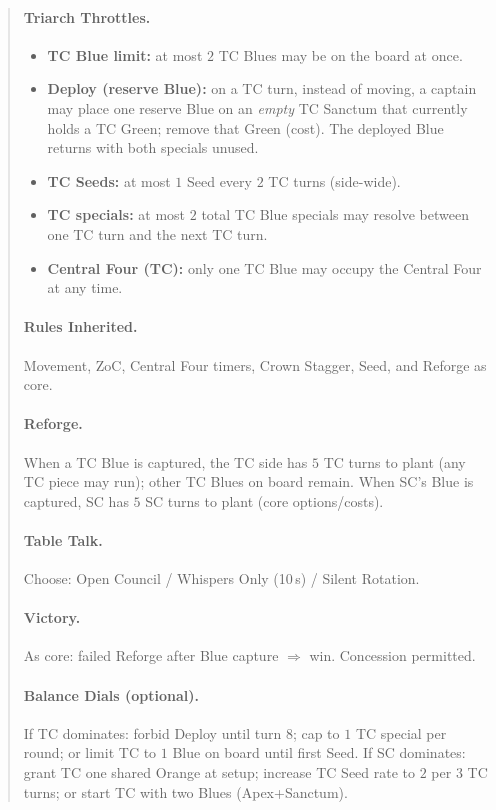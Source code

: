 \documentclass[11pt]{article}
\begin{document}
\begin{quote}
\paragraph{Triarch Throttles.}
\begin{itemize}
  \item \textbf{TC Blue limit:} at most $2$ TC Blues may be on the board at once.
  \item \textbf{Deploy (reserve Blue):} on a TC turn, instead of moving, a captain may place one reserve Blue on an \emph{empty} TC Sanctum that currently holds a TC Green; remove that Green (cost). The deployed Blue returns with both specials unused.
  \item \textbf{TC Seeds:} at most $1$ Seed every $2$ TC turns (side-wide).
  \item \textbf{TC specials:} at most $2$ total TC Blue specials may resolve between one TC turn and the next TC turn.
  \item \textbf{Central Four (TC):} only one TC Blue may occupy the Central Four at any time.
\end{itemize}

\paragraph{Rules Inherited.} Movement, ZoC, Central Four timers, Crown Stagger, Seed, and Reforge as core.

\paragraph{Reforge.} When a TC Blue is captured, the TC side has $5$ TC turns to plant (any TC piece may run); other TC Blues on board remain. When SC's Blue is captured, SC has $5$ SC turns to plant (core options/costs).

\paragraph{Table Talk.} Choose: Open Council / Whispers Only (10\,s) / Silent Rotation.

\paragraph{Victory.} As core: failed Reforge after Blue capture $\Rightarrow$ win. Concession permitted.

\paragraph{Balance Dials (optional).} If TC dominates: forbid Deploy until turn 8; cap to $1$ TC special per round; or limit TC to $1$ Blue on board until first Seed. If SC dominates: grant TC one shared Orange at setup; increase TC Seed rate to $2$ per $3$ TC turns; or start TC with two Blues (Apex+Sanctum).


\end{quote}
\end{document}
